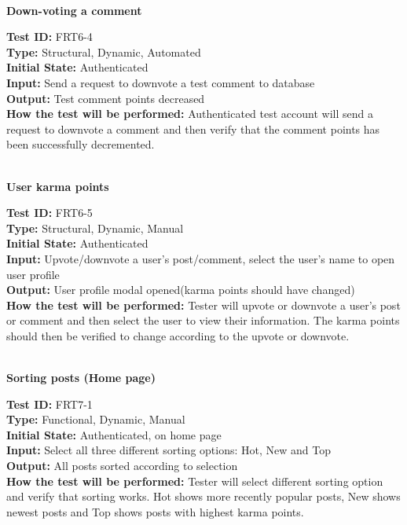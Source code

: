\documentclass[12pt,fleqn]{article}
\begin{document}
\newpage

\textbf{\\Down-voting a comment}
\begin{tcolorbox}
\textbf{Test ID:} FRT6-4\\
\textbf{Type:} Structural, Dynamic, Automated\\
\textbf{Initial State:} Authenticated\\
\textbf{Input:} Send a request to downvote a test comment to database\\
\textbf{Output:} Test comment points decreased\\
\textbf{How the test will be performed:} Authenticated test account will send a request to downvote a comment and then verify that the comment points has been successfully decremented.
\end{tcolorbox}

\textbf{\\User karma points}
\begin{tcolorbox}
\textbf{Test ID:} FRT6-5\\ %
\textbf{Type:} Structural, Dynamic, Manual\\
\textbf{Initial State:} Authenticated\\
\textbf{Input:} Upvote/downvote a user's post/comment, select the user's name to open user profile  \\
\textbf{Output:} User profile modal opened(karma points should have changed)\\
\textbf{How the test will be performed:} Tester will upvote or downvote a user's post or comment and then select the user to view their information. The karma points should then be verified to change according to the upvote or downvote.
\end{tcolorbox}

\textbf{\\Sorting posts (Home page)}
\begin{tcolorbox}
\textbf{Test ID:} FRT7-1\\
\textbf{Type:} Functional, Dynamic, Manual\\
\textbf{Initial State:} Authenticated, on home page\\
\textbf{Input:} Select all three different sorting options: Hot, New and Top \\
\textbf{Output:} All posts sorted according to selection\\
\textbf{How the test will be performed:} Tester will select different sorting option and verify that sorting works. Hot shows more recently popular posts, New shows newest posts and Top shows posts with highest karma points.
\end{tcolorbox}
\end{document}
